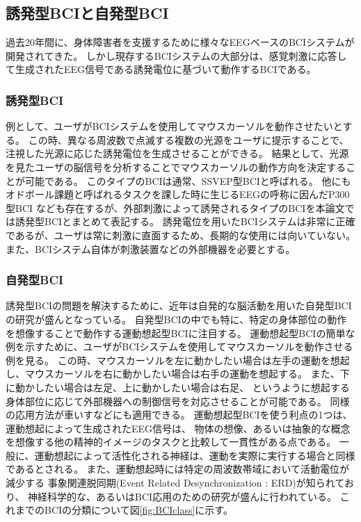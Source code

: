 \subsection{誘発型BCIと自発型BCI}
過去20年間に、身体障害者を支援するために様々なEEGベースのBCIシステムが開発されてきた。
しかし現存するBCIシステムの大部分は、感覚刺激に応答して生成されたEEG信号である誘発電位に基づいて動作するBCIである。
\subsubsection{誘発型BCI}
例として、ユーザがBCIシステムを使用してマウスカーソルを動作させたいとする。 
この時、異なる周波数で点滅する複数の光源をユーザに提示することで、
注視した光源に応じた誘発電位を生成させることができる。
結果として、光源を見たユーザの脳信号を分析することでマウスカーソルの動作方向を決定することが可能である。
このタイプのBCIは通常、SSVEP型BCIと呼ばれる。
他にもオドボール課題と呼ばれるタスクを課した時に生じるEEGの呼称に因んだP300型BCI
なども存在するが、外部刺激によって誘発されるタイプのBCIを本論文では誘発型BCIとまとめて表記する。
誘発電位を用いたBCIシステムは非常に正確であるが、ユーザは常に刺激に直面するため、長期的な使用には向いていない。
また、BCIシステム自体が刺激装置などの外部機器を必要とする。
\subsubsection{自発型BCI}
誘発型BCIの問題を解決するために、近年は自発的な脳活動を用いた自発型BCIの研究が盛んとなっている。
自発型BCIの中でも特に、特定の身体部位の動作を想像することで動作する運動想起型BCIに注目する。
運動想起型BCIの簡単な例を示すために、ユーザがBCIシステムを使用してマウスカーソルを動作させる例を見る。
この時、マウスカーソルを左に動かしたい場合は左手の運動を想起し、マウスカーソルを右に動かしたい場合は右手の運動を想起する。
また、下に動かしたい場合は左足、上に動かしたい場合は右足、
というように想起する身体部位に応じて外部機器への制御信号を対応させることが可能である。
同様の応用方法が車いすなどにも適用できる。
運動想起型BCIを使う利点の1つは、運動想起によって生成されたEEG信号は、
物体の想像、あるいは抽象的な概念を想像する他の精神的イメージのタスクと比較して一貫性がある点である。
一般に、運動想起によって活性化される神経は、運動を実際に実行する場合と同様であるとされる\cite{運動想起}。
また、運動想起時には特定の周波数帯域において活動電位が減少する
事象関連脱同期(Event Related Desynchronization : ERD)が知られており、
神経科学的な、あるいはBCI応用のための研究が盛んに行われている\cite{ERDとERS,ERDリハビリ,運動フィードバック}。
これまでのBCIの分類について図\ref{fig:BCIclass}に示す。

